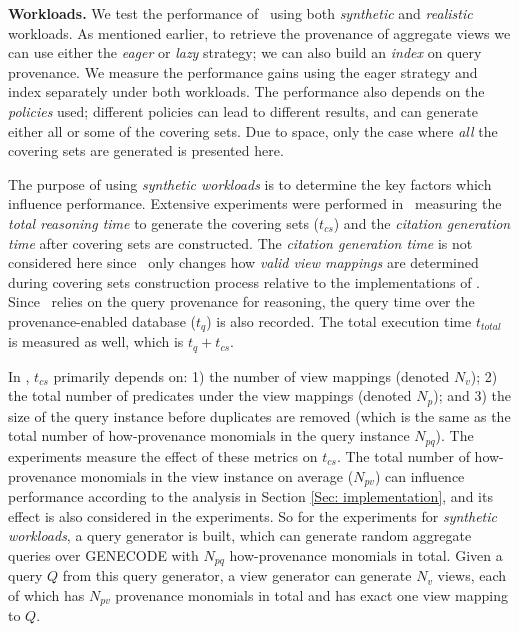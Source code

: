 {\bf Workloads.} 
We test the performance of \provalg\ using both {\em synthetic} and {\em realistic} workloads. 
As mentioned earlier, to retrieve the provenance of aggregate views we can use either the {\em eager} or {\em lazy} strategy; we can also build an {\em index} on query provenance. We measure the performance gains using the {eager strategy} and index separately under both workloads. The performance also depends on the {\em policies}
used; different policies can lead to different results, and can generate either all or some of the covering sets. Due to space, only the case where {\em all} the covering sets are generated is presented here.

The purpose of using {\em synthetic workloads} is to determine the key factors which influence performance. 
Extensive experiments were performed in~\cite{wu2018data} measuring the \textit{total reasoning time}  to generate the covering sets ($t_{cs}$) and the \textit{citation generation time}   after covering sets are constructed.  The \textit{citation generation time} is not considered here since \provalg\ only changes how {\em valid view mappings} are determined during covering sets construction process %
relative to the implementations of \rba. Since \provalg\ relies on the query provenance for reasoning, the query time over the provenance-enabled database ($t_{q}$) is also recorded. The total execution time $t_{total}$ is measured as well, which is $t_q+t_{cs}$.


In \cite{wu2018data}, $t_{cs}$ primarily depends on: 1) the number of view mappings (denoted $N_v$); 2) the total number of predicates under the view mappings (denoted $N_p$); and 3) the size of the query instance before duplicates are removed (which is the same as the total number of how-provenance monomials in the query instance $N_{pq}$). The experiments measure the effect of these metrics on $t_{cs}$. %
The total number of how-provenance monomials in the view instance on average ($N_{pv}$) can influence performance according to the analysis in Section \ref{Sec: implementation}, and its effect is also considered in the experiments. So for the experiments for {\em synthetic workloads}, a query generator is built, which can generate random aggregate queries over GENECODE with $N_{pq}$ how-provenance monomials in total. Given a query $Q$ from this query generator, a view generator can generate $N_v$ views, each of which has $N_{pv}$ provenance monomials in total and has exact one view mapping to $Q$. 

